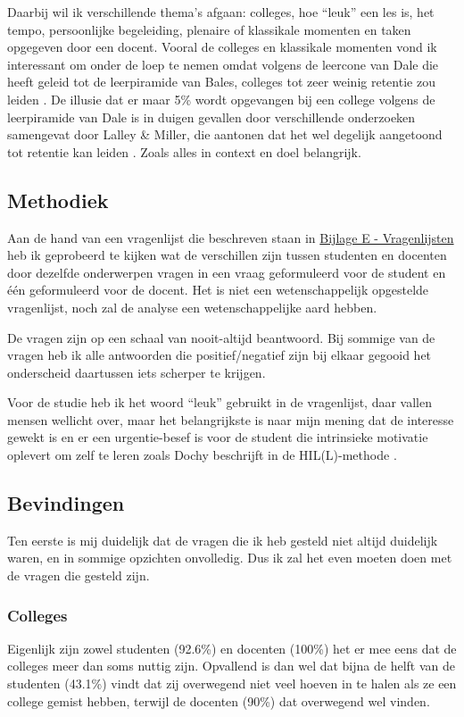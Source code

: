 Daarbij wil ik verschillende thema's afgaan: colleges, hoe ``leuk'' een les is, het tempo, persoonlijke begeleiding, plenaire of klassikale momenten en taken opgegeven door een docent. Vooral de colleges en klassikale momenten vond ik interessant om onder de loep te nemen omdat volgens de leercone van Dale die heeft geleid tot de leerpiramide van Bales, colleges tot zeer weinig retentie zou leiden \cite{leerpiramidebales}. De illusie dat er maar 5\% wordt opgevangen bij een college volgens de leerpiramide van Dale is in duigen gevallen door verschillende onderzoeken samengevat door Lalley \& Miller, die aantonen dat het wel degelijk aangetoond tot retentie kan leiden \cite{lalley2007learning}. Zoals alles in context en doel belangrijk.

\subsection{Methodiek}
Aan de hand van een vragenlijst die beschreven staan in \hyperref[sec:vragenlijstRP]{Bijlage E - Vragenlijsten} heb ik geprobeerd te kijken wat de verschillen zijn tussen studenten en docenten door dezelfde onderwerpen vragen in een vraag geformuleerd voor de student en één geformuleerd voor de docent. Het is niet een wetenschappelijk opgestelde vragenlijst, noch zal de analyse een wetenschappelijke aard hebben.

De vragen zijn op een schaal van nooit-altijd beantwoord. Bij sommige van de vragen heb ik alle antwoorden die positief/negatief zijn bij elkaar gegooid het onderscheid daartussen iets scherper te krijgen.

Voor de studie heb ik het woord ``leuk'' gebruikt in de vragenlijst, daar vallen mensen wellicht over, maar het belangrijkste is naar mijn mening dat de interesse gewekt is en er een urgentie-besef is voor de student die intrinsieke motivatie oplevert om zelf te leren zoals Dochy beschrijft in de HIL(L)-methode \cite{dochy2015high}.

\subsection{Bevindingen}
Ten eerste is mij duidelijk dat de vragen die ik heb gesteld niet altijd duidelijk waren, en in sommige opzichten onvolledig. Dus ik zal het even moeten doen met de vragen die gesteld zijn. 

\subsubsection{Colleges}
Eigenlijk zijn zowel studenten (92.6\%) en docenten (100\%) het er mee eens dat de colleges meer dan soms nuttig zijn. Opvallend is dan wel dat bijna de helft van de studenten (43.1\%) vindt dat zij overwegend niet veel hoeven in te halen als ze een college gemist hebben, terwijl de docenten (90\%) dat overwegend wel vinden.

